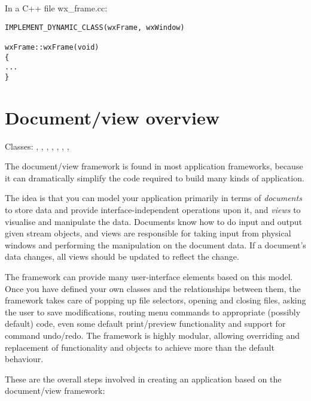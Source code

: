 In a C++ file wx\_frame.cc:

\begin{verbatim}
IMPLEMENT_DYNAMIC_CLASS(wxFrame, wxWindow)

wxFrame::wxFrame(void)
{
...
}
\end{verbatim}


\section{Document/view overview}\label{docviewoverview}

Classes: , , ,\rtfsp
{}, , ,
\rtfsp{}, 

The document/view framework is found in most application frameworks, because it
can dramatically simplify the code required to build many kinds of application.

The idea is that you can model your application primarily in terms of {\it documents} to store data
and provide interface-independent operations upon it, and {\it views} to visualise and manipulate
the data. Documents know how to do input and output given stream objects, and views are responsible
for taking input from physical windows and performing the manipulation on the document data.
If a document's data changes, all views should be updated to reflect the change.

The framework can provide many user-interface elements based on this model. Once you have defined
your own classes and the relationships between them, the framework takes care
of popping up file selectors, opening and closing files, asking the user to save
modifications, routing menu commands to appropriate (possibly default) code, even
some default print/preview functionality and support for command undo/redo.
The framework is highly modular, allowing overriding and replacement of functionality
and objects to achieve more than the default behaviour.

These are the overall steps involved in creating an application based on the document/view framework:

